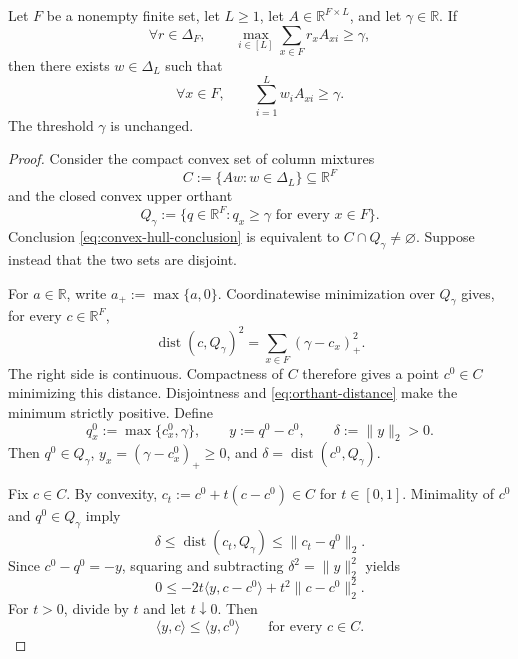 \begin{lemma}
\label{lem:step-003-convex-hull-alternative}
Let $F$ be a nonempty finite set, let $L\ge1$, let
$A\in\mathbb R^{F\times L}$, and let $\gamma\in\mathbb R$.  If
\begin{equation}\label{eq:convex-hull-premise}
\forall r\in\Delta_F,\qquad
\max_{i\in[L]}\sum_{x\in F}r_xA_{xi}\ge\gamma,
\end{equation}
then there exists $w\in\Delta_L$ such that
\begin{equation}\label{eq:convex-hull-conclusion}
\forall x\in F,\qquad
\sum_{i=1}^Lw_iA_{xi}\ge\gamma.
\end{equation}
The threshold $\gamma$ is unchanged.
\end{lemma}

\begin{proof}
Consider the compact convex set of column mixtures
\[
C:=\{Aw:w\in\Delta_L\}\subseteq\mathbb R^F
\]
and the closed convex upper orthant
\[
Q_\gamma:=\{q\in\mathbb R^F:q_x\ge\gamma
\text{ for every }x\in F\}.
\]
Conclusion \eqref{eq:convex-hull-conclusion} is equivalent to
$C\cap Q_\gamma\ne\varnothing$.  Suppose instead that the two sets are
disjoint.

For $a\in\mathbb R$, write $a_+:=\max\{a,0\}$.  Coordinatewise
minimization over $Q_\gamma$ gives, for every $c\in\mathbb R^F$,
\begin{equation}\label{eq:orthant-distance}
\operatorname{dist}(c,Q_\gamma)^2
=\sum_{x\in F}(\gamma-c_x)_+^2.
\end{equation}
The right side is continuous.  Compactness of $C$ therefore gives a point
$c^0\in C$ minimizing this distance.  Disjointness and
\eqref{eq:orthant-distance} make the minimum strictly positive.  Define
\begin{equation}\label{eq:closest-point-objects}
q_x^0:=\max\{c_x^0,\gamma\},\qquad
y:=q^0-c^0,\qquad
\delta:=\lVert y\rVert_2>0.
\end{equation}
Then $q^0\in Q_\gamma$,
$y_x=(\gamma-c_x^0)_+\ge0$, and
$\delta=\operatorname{dist}(c^0,Q_\gamma)$.

Fix $c\in C$.  By convexity,
$c_t:=c^0+t(c-c^0)\in C$ for $t\in[0,1]$.  Minimality of $c^0$ and
$q^0\in Q_\gamma$ imply
\[
\delta\le\operatorname{dist}(c_t,Q_\gamma)
\le\lVert c_t-q^0\rVert_2.
\]
Since $c^0-q^0=-y$, squaring and subtracting
$\delta^2=\lVert y\rVert_2^2$ yields
\[
0\le-2t\langle y,c-c^0\rangle
+t^2\lVert c-c^0\rVert_2^2.
\]
For $t>0$, divide by $t$ and let $t\downarrow0$.  Then
\begin{equation}\label{eq:closest-point-support}
\langle y,c\rangle\le\langle y,c^0\rangle
\qquad\text{for every }c\in C.
\end{equation}


\end{proof}
